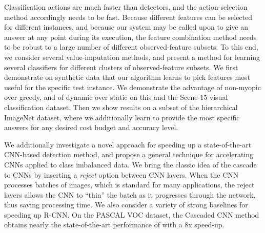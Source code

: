 Classification actions are much faster than detectors, and the action-selection method accordingly needs to be fast.
Because different features can be selected for different instances, and because our system may be called upon to give an answer at any point during its execution, the feature combination method needs to be robust to a large number of different observed-feature subsets.
To this end, we consider several value-imputation methods, and present a method for learning several classifiers for different clusters of observed-feature subsets.
We first demonstrate on synthetic data that our algorithm learns to pick features most useful for the specific test instance.
We demonstrate the advantage of non-myopic over greedy, and of dynamic over static on this and the Scene-15 visual classification dataset.
Then we show results on a subset of the hierarchical ImageNet dataset, where we additionally learn to provide the most specific answers for any desired cost budget and accuracy level.

We additionally investigate a novel approach for speeding up a state-of-the-art CNN-based detection method, and propose a general technique for accelerating CNNs applied to class imbalanced data.
We bring the classic idea of the cascade to CNNs by inserting a \emph{reject} option between CNN layers.
When the CNN processes batches of images, which is standard for many applications, the reject layers allows the CNN to ``thin'' the batch as it progresses through the network, thus saving processing time.
We also consider a variety of strong baselines for speeding up R-CNN.
On the PASCAL VOC dataset, the Cascaded CNN method obtains nearly the state-of-the-art performance of \cite{Girshick-CVPR-2014} with a 8x speed-up.
